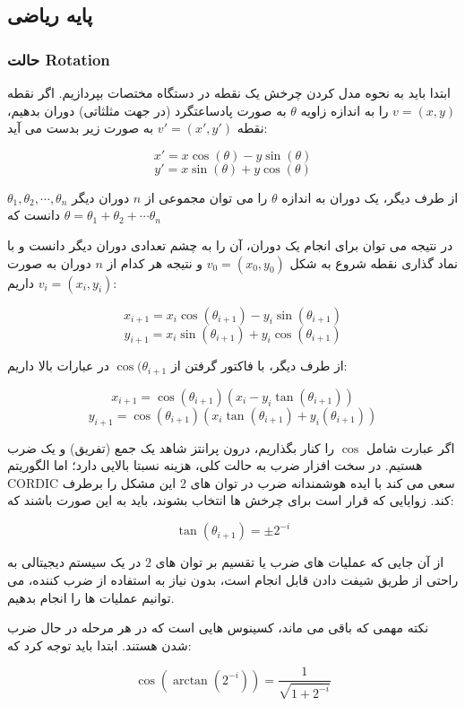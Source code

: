 \documentclass[12pt,titlepage,a4page , tikz , multi,table , svgnames,xcdraw]{article}
\begin{document}
\newpage

\subsection{پایه ریاضی}

\subsubsection{حالت Rotation}
ابتدا باید به نحوه مدل کردن چرخش یک نقطه در دستگاه مختصات بپردازیم. اگر نقطه $v = (x , y)$ را به اندازه زاویه $\theta$ به صورت پادساعتگرد (در جهت مثلثاتی) دوران بدهیم، نقطه $v' = (x' , y')$ به صورت زیر بدست می آید:

$$x' = x \cos(\theta) - y \sin(\theta)$$
$$y' = x \sin (\theta) + y \cos (\theta) $$

از طرف دیگر، یک دوران به اندازه $\theta$ را می توان مجموعی از $n$ دوران دیگر $\theta_1 , \theta_2 , \cdots , \theta_n$ دانست که $\theta = \theta_1 + \theta_2 + \cdots \theta_n$

در نتیجه می توان برای انجام یک دوران، آن را به چشم تعدادی دوران دیگر دانست و با نماد گذاری نقطه شروع به شکل $v_0 = (x_0 , y_0)$ و نتیجه هر کدام از $n$ دوران به صورت $v_i = (x_i , y_i)$ داریم:

$$x_{i+1} = x_{i} \cos(\theta_{i+1}) - y_{i} \sin(\theta_{i+1})$$
$$y_{i+1} = x_{i} \sin (\theta_{i+1}) + y_{i} \cos (\theta_{i+1}) $$

از طرف دیگر، با فاکتور گرفتن از $\cos(\theta_{i+1}$ در عبارات بالا داریم:

$$x_{i+1} =\cos(\theta_{i+1})( x_{i}  - y_{i} \tan(\theta_{i+1}))$$
$$y_{i+1} = \cos(\theta_{i+1})(x_{i} \tan (\theta_{i+1}) + y_{i}  (\theta_{i+1})) $$

اگر عبارت شامل $\cos$ را کنار بگذاریم، درون پرانتز شاهد یک جمع (تفریق) و یک ضرب هستیم. در سخت افزار ضرب به حالت کلی، هزینه نسبتا بالایی دارد؛ اما الگوریتم CORDIC سعی می کند با ایده هوشمندانه ضرب در توان های $2$ این مشکل را برطرف کند. زوایایی که قرار است برای چرخش ها انتخاب بشوند، باید به این صورت باشند که:

$$\tan (\theta_{i+1}) = \pm 2^{-i}$$

از آن جایی که عملیات های ضرب یا تقسیم بر توان های $2$ در یک سیستم دیجیتالی به راحتی از طریق شیفت دادن قابل انجام است، بدون نیاز به استفاده از ضرب کننده، می توانیم عملیات ها را انجام بدهیم.

نکته مهمی که باقی می ماند، کسینوس هایی است که در هر مرحله در حال ضرب شدن هستند. ابتدا باید توجه کرد که:

$$\cos (\arctan (2 ^{-i})) = \frac{1}{\sqrt{1 + 2^{-i}}}$$
\end{document}
